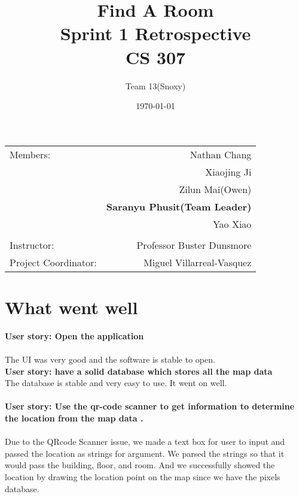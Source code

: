\documentclass[12pt]{article}
\title{\textbf{Find A Room} \\ Sprint 1 Retrospective \\ CS 307} %
\author{Team \textsc{13}(Snoxy)} %
\date{\today} %
\begin{document}
\maketitle %

\begin{center}
\begin{tabular}{l r}
Members: & Nathan Chang \\ %
& Xiaojing Ji \\
& Zilun Mai(Owen) \\
& \textbf{Saranyu Phusit(Team Leader)} \\
& Yao Xiao \\
\\
\bigskip
Instructor: & Professor Buster Dunsmore \\%
Project Coordinator: & Miguel Villarreal-Vasquez %

\end{tabular}
\end{center}

\newpage




\newpage
\section{What went well}

\textbf{User story: Open the application} \\ \\
The UI was very good and the software is stable to open. \\


\textbf{User story: have a solid database which stores all the map data} \\

The database is stable and very easy to use. It went on well. \\ \\ 

\textbf{User story: Use the qr-code scanner to get information to determine the location from the map data
.} \\ \\
Due to the QRcode Scanner issue, we made a text box for user to input and passed the location as strings for argument. We parsed the strings so that it would pass the building, floor, and room. And we successfully showed the location by drawing the location point on the map since we have the pixels database. \\
\end{document}

